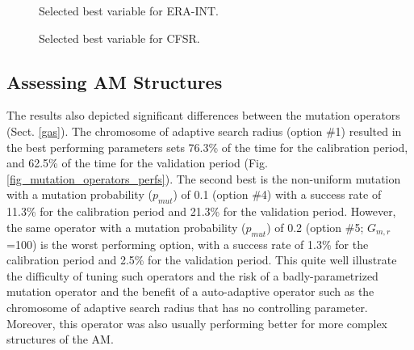 \documentclass[draft]{agujournal2019}
\begin{document}


\begin{figure}[h]
	\noindent{}
	\caption{Selected best variable for ERA-INT.}
	\label{fig_best_era_int}
\end{figure}

\begin{figure}[h]
	\noindent{}
	\caption{Selected best variable for CFSR.}
	\label{fig_best_cfsr}
\end{figure}

\subsection{Assessing AM Structures}
\label{structures}




The results also depicted significant differences between the mutation operators (Sect. \ref{gas}). The chromosome of adaptive search radius (option \#1) resulted in the best performing parameters sets 76.3\% of the time for the calibration period, and 62.5\% of the time for the validation period (Fig. \ref{fig_mutation_operators_perfs}).  The second best is the non-uniform mutation with a mutation probability ($p_{mut}$) of 0.1 (option \#4) with a success rate of 11.3\% for the calibration period and 21.3\% for the validation period. However, the same operator with a  mutation probability ($p_{mut}$) of 0.2 (option \#5; $G_{m,r}$=100) is the worst performing option, with a success rate of 1.3\% for the calibration period and 2.5\% for the validation period. This quite well illustrate the difficulty of tuning such operators and the risk of a badly-parametrized mutation operator and the benefit of a auto-adaptive operator such as the chromosome of adaptive search radius that has no controlling parameter. Moreover, this operator was also usually performing better for more complex structures of the AM.
\end{document}
